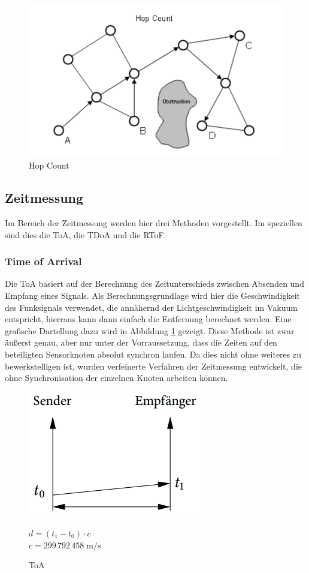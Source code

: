 \begin{figure}[h!]
  \centering
  \includegraphics[scale=0.60]{img/hop_count1}
  \caption{Hop Count}
\end{figure}

\subsection{Zeitmessung}
Im Bereich der Zeitmessung werden hier drei Methoden vorgestellt. Im speziellen sind dies die \ac{ToA}, die \ac{TDoA} und die \ac{RToF}.
\subsubsection{Time of Arrival}
Die \ac{ToA} basiert auf der Berechnung des Zeitunterschieds zwischen Absenden und Empfang eines Signals. Als Berechnungsgrundlage wird hier
die Geschwindigkeit des Funksignals verwendet, die annähernd der Lichtgeschwindigkeit im Vakuum entspricht, hierraus kann dann einfach die 
Entfernung berechnet werden. Eine grafische Dartellung dazu wird in Abbildung \ref{fig:ToA} gezeigt. Diese Methode ist zwar äußerst genau, aber nur unter der Vorraussetzung, dass die Zeiten auf den beteiligten Sensorknoten absolut synchron laufen. Da dies nicht ohne weiteres zu bewerkstelligen ist, wurden verfeinerte Verfahren der Zeitmessung entwickelt, die ohne Synchronisation der einzelnen Knoten arbeiten können. 

\begin{figure}[h!]    
  \centering
  \includegraphics[scale=0.5]{img/time1}\\~\\
  \label{fig:ToA}
  $d = (t_{1} - t_{0}) \cdot c$\\
  $c=299\,792\,458\;\mathrm{m/s}$
  \caption{ToA}
\end{figure}

